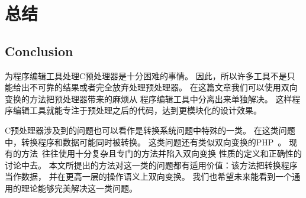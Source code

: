 \chapter{总结}
\section{Conclusion}
\label{sec:conclusion}

为程序编辑工具处理C预处理器是十分困难的事情。
因此，所以许多工具不是只能给出不可靠的结果或者完全放弃处理预处理器。
在这篇文章我们可以使用双向变换的方法把预处理器带来的麻烦从
程序编辑工具中分离出来单独解决。
这样程序编辑工具就能专注于预处理之后的代码，达到更模块化的设计效果。

C预处理器涉及到的问题也可以看作是转换系统问题中特殊的一类。
在这类问题中，转换程序和数据可能同时被转换。
这类问题还有类似双向变换的PHP~\parencite{wang2012automating}。
现有的方法~\parencite{wang2012automating}往往使用十分复杂且专门的方法并陷入双向变换
性质的定义和正确性的讨论中去。
本文所提出的方法对这一类的问题都有适用价值：该方法把转换程序当作数据，
并在更高一层的操作语义上双向变换。
我们也希望未来能看到一个通用的理论能够完美解决这一类问题。



